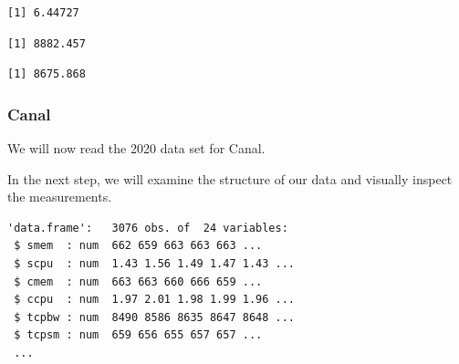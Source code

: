 \begin{verbatim}
[1] 6.44727
\end{verbatim}

\begin{Shaded}
\begin{Highlighting}[]
\SpecialCharTok{\$}
\end{Highlighting}
\end{Shaded}

\begin{verbatim}
[1] 8882.457
\end{verbatim}

\begin{Shaded}
\begin{Highlighting}[]
\SpecialCharTok{\$}
\end{Highlighting}
\end{Shaded}

\begin{verbatim}
[1] 8675.868
\end{verbatim}

\subsubsection{Canal}

We will now read the 2020 data set for Canal.

\begin{Shaded}
\begin{Highlighting}[]
\OtherTok{\textless{}{-}} 
\OtherTok{\textless{}{-}} \NormalTok{(}\NormalTok{,}\NormalTok{))}
\end{Highlighting}
\end{Shaded}

In the next step, we will examine the structure of our data and visually
inspect the measurements.

\begin{Shaded}
\begin{Highlighting}[]
\end{Highlighting}
\end{Shaded}

\begin{verbatim}
'data.frame':   3076 obs. of  24 variables:
 $ smem  : num  662 659 663 663 663 ...
 $ scpu  : num  1.43 1.56 1.49 1.47 1.43 ...
 $ cmem  : num  663 663 660 666 659 ...
 $ ccpu  : num  1.97 2.01 1.98 1.99 1.96 ...
 $ tcpbw : num  8490 8586 8635 8647 8648 ...
 $ tcpsm : num  659 656 655 657 657 ...
 ...
\end{verbatim}

